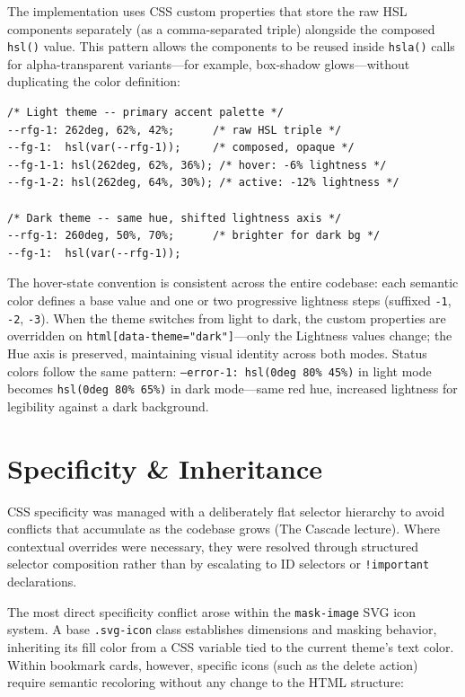 \documentclass[11pt,a4paper]{book}
\begin{document}
The implementation uses CSS custom properties that store the raw HSL components separately (as a comma-separated triple) alongside the composed \texttt{hsl()} value. This pattern allows the components to be reused inside \texttt{hsla()} calls for alpha-transparent variants---for example, box-shadow glows---without duplicating the color definition:

\begin{verbatim}
/* Light theme -- primary accent palette */
--rfg-1: 262deg, 62%, 42%;      /* raw HSL triple */
--fg-1:  hsl(var(--rfg-1));     /* composed, opaque */
--fg-1-1: hsl(262deg, 62%, 36%); /* hover: -6% lightness */
--fg-1-2: hsl(262deg, 64%, 30%); /* active: -12% lightness */

/* Dark theme -- same hue, shifted lightness axis */
--rfg-1: 260deg, 50%, 70%;      /* brighter for dark bg */
--fg-1:  hsl(var(--rfg-1));
\end{verbatim}

The hover-state convention is consistent across the entire codebase: each semantic color defines a base value and one or two progressive lightness steps (suffixed \texttt{-1}, \texttt{-2}, \texttt{-3}). When the theme switches from light to dark, the custom properties are overridden on \texttt{html[data-theme="dark"]}---only the Lightness values change; the Hue axis is preserved, maintaining visual identity across both modes. Status colors follow the same pattern: \texttt{--error-1: hsl(0deg 80\% 45\%)} in light mode becomes \texttt{hsl(0deg 80\% 65\%)} in dark mode---same red hue, increased lightness for legibility against a dark background.

\section{Specificity \& Inheritance}

CSS specificity was managed with a deliberately flat selector hierarchy to avoid conflicts that accumulate as the codebase grows (The Cascade lecture). Where contextual overrides were necessary, they were resolved through structured selector composition rather than by escalating to ID selectors or \texttt{!important} declarations.

The most direct specificity conflict arose within the \texttt{mask-image} SVG icon system. A base \texttt{.svg-icon} class establishes dimensions and masking behavior, inheriting its fill color from a CSS variable tied to the current theme's text color. Within bookmark cards, however, specific icons (such as the delete action) require semantic recoloring without any change to the HTML structure:
\end{document}
